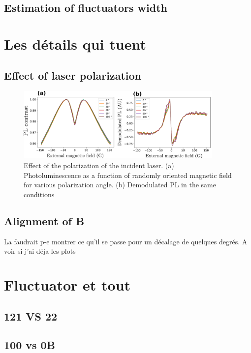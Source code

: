 \documentclass[preprintnumbers,amsmath,amssymb,onecolumn,12pt]{revtex4-2}
\begin{document}
\subsection{Estimation of fluctuators width}
\section{Les détails qui tuent}
\subsection{Effect of laser polarization}
\begin{figure}
\includegraphics[width=0.9\textwidth]{Figures_SI/fig_Pola}
\caption{Effect of the polarization of the incident laser. (a) Photoluminescence as a function of randomly oriented magnetic field for various polarization angle. (b) Demodulated PL in the same conditions}
\label{Pola}
\end{figure}
\subsection{Alignment of B}
La faudrait p-e montrer ce qu'il se passe pour un décalage de quelques degrés. A voir si j'ai déja les plots
\section{Fluctuator et tout}
\subsection{121 VS 22}
\subsection{100 vs 0B}


{}
\end{document}

